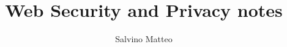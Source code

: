 \documentclass[11pt]{article}
\title{Web Security and Privacy notes}
\author{Salvino Matteo}
\date{}
\begin{document}
\maketitle
\pagebreak

\tableofcontents
\pagebreak
















\end{document}
